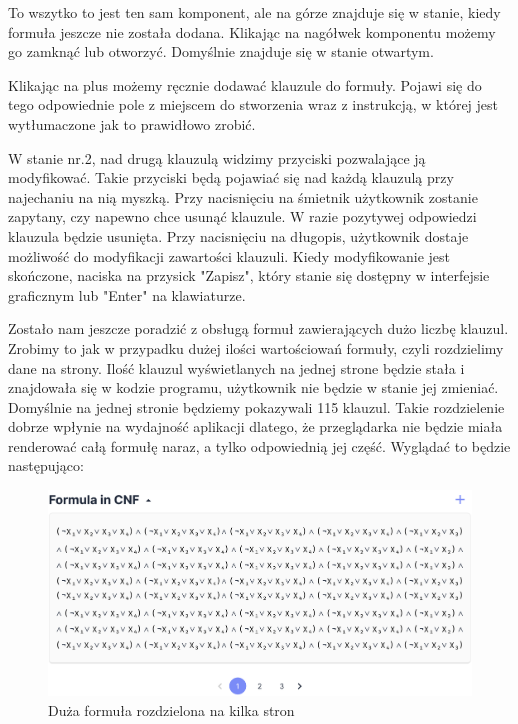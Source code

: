 \documentclass[a4paper,12pt,oneside]{book}
\theoremstyle{definition}
\begin{document}
\noindent To wszytko to jest ten sam komponent, ale na górze znajduje się w stanie, kiedy formuła jeszcze nie została dodana. Klikając na nagółwek komponentu możemy go zamknąć lub otworzyć. Domyślnie znajduje się w stanie otwartym.

Klikając na plus możemy ręcznie dodawać klauzule do formuły. Pojawi się do tego odpowiednie pole z miejscem do stworzenia wraz z instrukcją, w której jest wytłumaczone jak to prawidłowo zrobić.

W stanie nr.2, nad drugą klauzulą widzimy przyciski pozwalające ją modyfikować. Takie przyciski będą pojawiać się nad każdą klauzulą przy najechaniu na nią myszką. Przy nacisnięciu na śmietnik użytkownik zostanie zapytany, czy napewno chce usunąć klauzule. W razie pozytywej odpowiedzi klauzula będzie usunięta. Przy nacisnięciu na długopis, użytkownik dostaje możliwość do modyfikacji zawartości klauzuli. Kiedy modyfikowanie jest skończone, naciska na przysick "Zapisz", który stanie się dostępny w interfejsie graficznym lub "Enter" na klawiaturze.

Zostało nam jeszcze poradzić z obsługą formuł zawierających dużo liczbę klauzul. Zrobimy to jak w przypadku dużej ilości wartościowań formuły, czyli rozdzielimy dane na strony. Ilość klauzul wyświetlanych na jednej strone będzie stała i znajdowała się w kodzie programu, użytkownik nie będzie w stanie jej zmieniać. Domyślnie na jednej stronie będziemy pokazywali 115 klauzul. Takie rozdzielenie dobrze wpłynie na wydajność aplikacji dlatego, że przeglądarka nie będzie miała renderować całą formułę naraz, a tylko odpowiednią jej część. Wyglądać to będzie następująco:

\begin{figure}[ht]
    \centering
    \includegraphics[width=14.30cm]{10}
    \caption{Duża formuła rozdzielona na kilka stron}
    \label{fig:10}
\end{figure}
\end{document}
